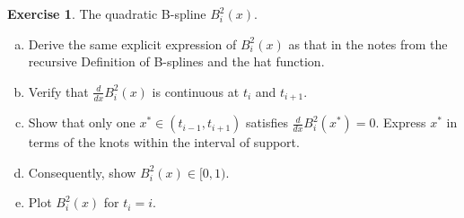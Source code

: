 \documentclass[a4paper]{book}
\numberwithin{equation}{chapter}
\theoremstyle{definition}
\newtheorem{exc}[exm]{Exercise}
\begin{document}
\begin{exc}
  The quadratic B-spline $B_i^2(x)$.
  \begin{enumerate}[(a)]
  \item Derive the same explicit expression of $B_i^2(x)$ as that in the notes from the recursive Definition of B-splines and the hat function.

  \item Verify that $\frac{d}{dx}B_i^2(x)$ is continuous at $t_i$ and $t_{i+1}$.

  \item Show that only one $x^* \in (t_{i-1},t_{i+1})$ satisfies $\frac{d}{dx}B_i^2(x^*) = 0$. Express $x^*$ in terms of the knots within the interval of support.

  \item Consequently, show $B_i^2(x) \in [0,1)$.

  \item Plot $B_i^2(x)$ for $t_i = i$.
  \end{enumerate}
\end{exc}
\end{document}
